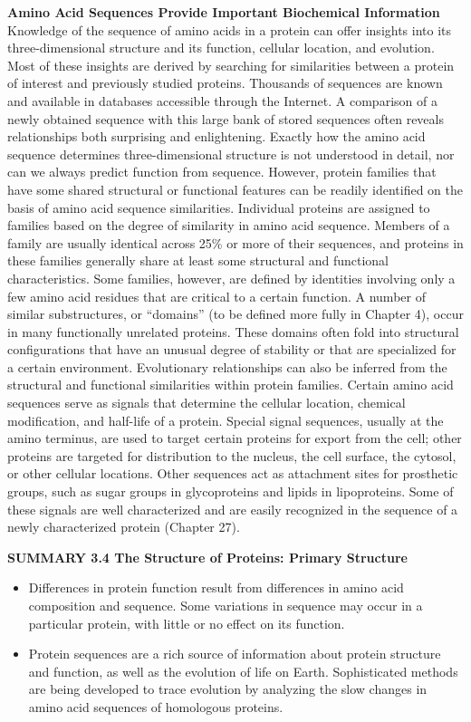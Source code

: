 \textbf{Amino Acid Sequences Provide Important Biochemical Information}\\
Knowledge of the sequence of amino acids in a protein can offer insights into its three-dimensional structure and its function, cellular location, and evolution. Most of these insights are derived by searching for similarities between a protein of interest and previously studied proteins. Thousands of sequences are known and available in databases accessible through the Internet. A comparison of a newly obtained sequence with this large bank of stored sequences often reveals relationships both surprising and enlightening. Exactly how the amino acid sequence determines three-dimensional structure is not understood in detail, nor can we always predict function from sequence. However, protein families that have some shared structural or functional features can be readily identified on the basis of amino acid sequence similarities. Individual proteins are assigned to families based on the degree of similarity in amino acid sequence. Members of a family are usually identical across 25\% or more of their sequences, and proteins in these families generally share at least some structural and functional characteristics. Some families, however, are defined by identities involving only a few amino acid residues that are critical to a certain function. A number of similar substructures, or “domains” (to be defined more fully in Chapter 4), occur in many functionally unrelated proteins. These domains often fold into structural configurations that have an unusual degree of stability or that are specialized for a certain environment. Evolutionary relationships can also be inferred from the structural and functional similarities within protein families. Certain amino acid sequences serve as signals that determine the cellular location, chemical modification, and half-life of a protein. Special signal sequences, usually at the amino terminus, are used to target certain proteins for export from the cell; other proteins are targeted for distribution to the nucleus, the cell surface, the cytosol, or other cellular locations. Other sequences act as attachment sites for prosthetic groups, such as sugar groups in glycoproteins and lipids in lipoproteins. Some of these signals are well characterized and are easily recognized in the sequence of a newly characterized protein (Chapter 27). 

\textbf{SUMMARY 3.4 The Structure of Proteins: Primary Structure}\\
\begin{itemize}
\item Differences in protein function result from differences in amino acid composition and sequence. Some variations in sequence may occur in a particular protein, with little or no effect on its function.
\item Protein sequences are a rich source of information about protein structure and function, as well as the evolution of life on Earth. Sophisticated methods are being developed to trace evolution by analyzing the slow changes in amino acid sequences of homologous proteins.
\end{itemize}

